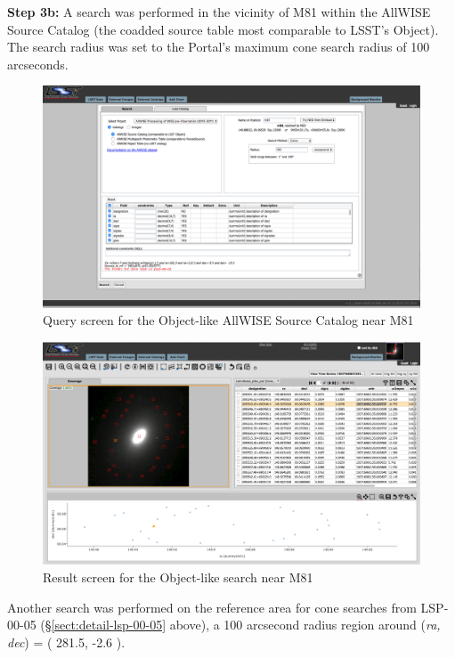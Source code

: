\textbf{Step 3b:} A search was performed in the vicinity of M81 within the AllWISE Source Catalog (the coadded source table most comparable to LSST's Object).
The search radius was set to the Portal's maximum cone search radius of 100 arcseconds.

\begin{figure}
  \includegraphics[width=\linewidth]{lsp-00-35/m81-searchScreen.png}
  \caption{Query screen for the Object-like AllWISE Source Catalog near M81}
  \label{fig:lsp-00-35-portal-search-m81}
\end{figure}

\begin{figure}
  \includegraphics[width=\linewidth]{lsp-00-35/m81-searchResult.png}
  \caption{Result screen for the Object-like search near M81}
  \label{fig:lsp-00-35-portal-objects-m81}
\end{figure}

Another search was performed on the reference area for cone searches from LSP-00-05 (\S\ref{sect:detail-lsp-00-05} above),
a 100 arcsecond radius region around (\textit{ra, dec}) = ( 281.5, -2.6 ).

